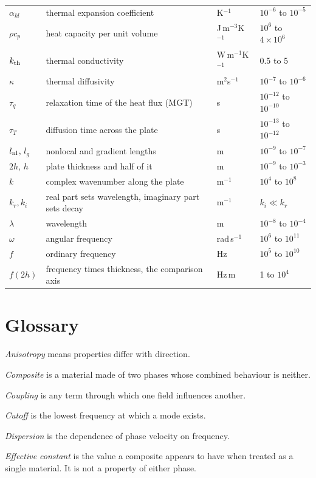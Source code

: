 \documentclass[11pt]{article}
\begin{document}
\begin{center}
\begin{tabular}{p{1.9cm}p{6.0cm}p{2.4cm}p{2.6cm}}
$\alpha_{kl}$ & thermal expansion coefficient & K$^{-1}$ & $10^{-6}$ to $10^{-5}$\\
$\rho c_p$ & heat capacity per unit volume & J\,m$^{-3}$K$^{-1}$ & $10^{6}$ to $4\times10^{6}$\\
$k_{\rm th}$ & thermal conductivity & W\,m$^{-1}$K$^{-1}$ & 0.5 to 5\\
$\kappa$ & thermal diffusivity & m$^2$s$^{-1}$ & $10^{-7}$ to $10^{-6}$\\
$\tau_q$ & relaxation time of the heat flux (MGT) & s & $10^{-12}$ to $10^{-10}$\\
$\tau_T$ & diffusion time across the plate & s & $10^{-13}$ to $10^{-12}$\\
$l_{\rm nl}$, $l_g$ & nonlocal and gradient lengths & m & $10^{-9}$ to $10^{-7}$\\
$2h$, $h$ & plate thickness and half of it & m & $10^{-9}$ to $10^{-3}$\\
$k$ & complex wavenumber along the plate & m$^{-1}$ & $10^{4}$ to $10^{8}$\\
$k_r,k_i$ & real part sets wavelength, imaginary part sets decay & m$^{-1}$ & $k_i\ll k_r$\\
$\lambda$ & wavelength & m & $10^{-8}$ to $10^{-4}$\\
$\omega$ & angular frequency & rad\,s$^{-1}$ & $10^{6}$ to $10^{11}$\\
$f$ & ordinary frequency & Hz & $10^{5}$ to $10^{10}$\\
$f(2h)$ & frequency times thickness, the comparison axis & Hz\,m & 1 to $10^{4}$\\
\bottomrule
\end{tabular}
\end{center}

\section{Glossary}

\textit{Anisotropy} means properties differ with direction.

\textit{Composite} is a material made of two phases whose combined behaviour is neither.

\textit{Coupling} is any term through which one field influences another.

\textit{Cutoff} is the lowest frequency at which a mode exists.

\textit{Dispersion} is the dependence of phase velocity on frequency.

\textit{Effective constant} is the value a composite appears to have when treated as a single material. It is
not a property of either phase.
\end{document}
